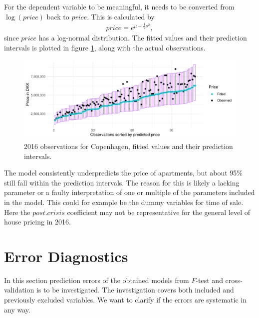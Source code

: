 For the dependent variable to be meaningful, it needs to be converted from $\log(price)$ back to $price$. 
This is calculated by
\begin{align*}
    price = e^{\mu + \frac{1}{2} s^2},
\end{align*}
since $price$ has a log-normal distribution.  
The fitted values and their prediction intervals is plotted in figure \ref{fig:predictive_intervals_observations_fitted}, along with the actual observations. 
\begin{figure}[H]
    \centering
    \includegraphics[width = .8\textwidth]{figures/prediction_interval.pdf}
    \caption{2016 observations for Copenhagen, fitted values and their prediction intervals.}
    \label{fig:predictive_intervals_observations_fitted}
\end{figure}
The model consistently underpredicts the price of apartments, but about 95\% still fall within the prediction intervals. 
The reason for this is likely a lacking parameter or a faulty interpretation of one or multiple of the parameters included in the model. 
This could for example be the dummy variables for time of sale. 
Here the $post.crisis$ coefficient may not be representative for the general level of house pricing in 2016.






\section{Error Diagnostics}
In this section prediction errors of the obtained models from $F$-test and cross-validation is to be investigated. The investigation covers both included and previously excluded variables. We want to clarify if the errors are systematic in any way.

